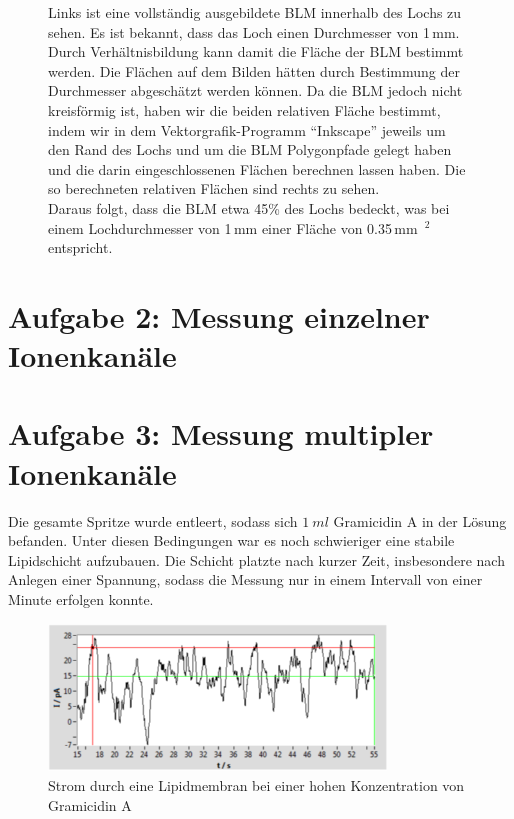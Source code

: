 \documentclass[a4paper,ngerman]{scrartcl}
\begin{document}
\begin{figure}[tbh!]
\begin{minipage}[b]{.4\textwidth}
  \end{minipage}
  \caption{Links ist eine vollständig ausgebildete BLM innerhalb des Lochs zu sehen.
Es ist bekannt, dass das Loch einen Durchmesser von 1\,mm. Durch Verhältnisbildung kann damit die Fläche 
der BLM bestimmt werden. Die Flächen auf dem Bilden hätten durch Bestimmung der Durchmesser abgeschätzt werden können. Da die BLM jedoch
nicht kreisförmig ist, haben wir die beiden relativen Fläche bestimmt, indem wir in dem Vektorgrafik-Programm "`Inkscape"'
jeweils um den Rand des Lochs und um die BLM Polygonpfade gelegt haben und die darin eingeschlossenen Flächen berechnen lassen haben. Die so 
berechneten relativen Flächen sind rechts zu sehen.\\
Daraus folgt, dass die BLM etwa 45\% des Lochs bedeckt, was bei einem Lochdurchmesser von 1\,mm einer Fläche von 0.35\,mm~$^2$ entspricht.}
\label{fig:blmflaeche}
\end{figure}

\section{Aufgabe 2: Messung einzelner Ionenkanäle}

\section{Aufgabe 3: Messung multipler Ionenkanäle}

Die gesamte Spritze wurde entleert, sodass sich $\SI{1}{ml}$ Gramicidin A in der Lösung befanden. Unter diesen Bedingungen war es noch schwieriger eine stabile Lipidschicht aufzubauen.
Die Schicht platzte nach kurzer Zeit, insbesondere nach Anlegen einer Spannung, sodass die Messung nur in einem Intervall von einer Minute erfolgen konnte.

\begin{figure}[tbh!]
\includegraphics[width=0.8\textwidth]{abbildungen/mehrkanal_raw.png}
\caption{Strom durch eine Lipidmembran bei einer hohen Konzentration von Gramicidin A}
\label{fig:mehrkanal-roh}
\end{figure}
\end{document}
